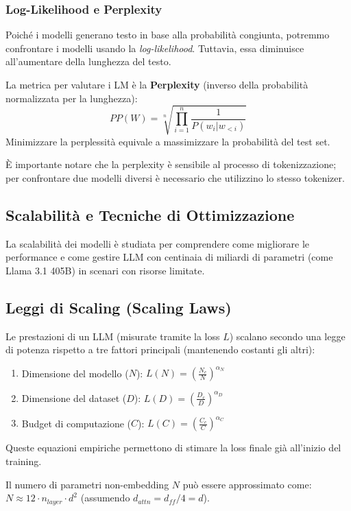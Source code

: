        \subsubsection{Log-Likelihood e Perplexity}
            Poiché i modelli generano testo in base alla probabilità congiunta, potremmo confrontare i modelli usando la \textit{log-likelihood}. Tuttavia, essa diminuisce all'aumentare della lunghezza del testo. 
            
            La metrica per valutare i LM è la \textbf{Perplexity} (inverso della probabilità normalizzata per la lunghezza):
            $$ PP(W) = \sqrt[n]{\prod_{i=1}^n \frac{1}{P(w_i | w_{<i})}} $$
            Minimizzare la perplessità equivale a massimizzare la probabilità del test set.

            È importante notare che la perplexity è sensibile al processo di tokenizzazione; per confrontare due modelli diversi è necessario che utilizzino lo stesso tokenizer.

    \subsection{Scalabilità e Tecniche di Ottimizzazione}

        La scalabilità dei modelli è studiata per comprendere come migliorare le performance e come gestire LLM con centinaia di miliardi di parametri (come Llama 3.1 405B) in scenari con risorse limitate.

    \subsection{Leggi di Scaling (Scaling Laws)}
        Le prestazioni di un LLM (misurate tramite la loss $L$) scalano secondo una legge di potenza rispetto a tre fattori principali (mantenendo costanti gli altri):
        \begin{enumerate}
            \item Dimensione del modello ($N$): $L(N) = (\frac{N_c}{N})^{\alpha_N}$
            \item Dimensione del dataset ($D$): $L(D) = (\frac{D_c}{D})^{\alpha_D}$
            \item Budget di computazione ($C$): $L(C) = (\frac{C_c}{C})^{\alpha_C}$
        \end{enumerate}
        Queste equazioni empiriche permettono di stimare la loss finale già all'inizio del training.

        Il numero di parametri non-embedding $N$ può essere approssimato come:
        $N \approx 12 \cdot n_{layer} \cdot d^2$ 
        (assumendo $d_{attn} = d_{ff}/4 = d$).

